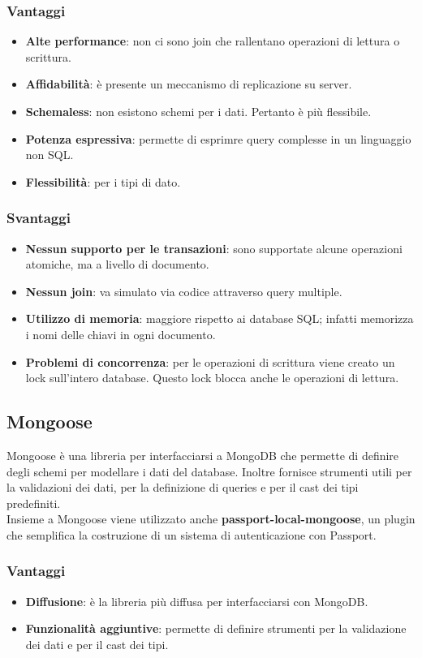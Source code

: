 \subsubsection{Vantaggi}
\begin{itemize}
\item \textbf{Alte performance}: non ci sono join che rallentano operazioni di lettura o scrittura. 
\item \textbf{Affidabilit\`a}: \`e presente un meccanismo di replicazione su server.
\item \textbf{Schemaless}: non esistono schemi per i dati. Pertanto \`e pi\`u flessibile.
\item \textbf{Potenza espressiva}: permette di esprimre query complesse in un linguaggio non SQL.
\item \textbf{Flessibilit\`a}: per i tipi di dato.
\end{itemize}
\subsubsection{Svantaggi}
\begin{itemize}
\item \textbf{Nessun supporto per le transazioni}: sono supportate alcune operazioni atomiche, ma a livello di documento.
\item \textbf{Nessun join}: va simulato via codice attraverso query multiple.
\item \textbf{Utilizzo di memoria}: maggiore rispetto ai database SQL; infatti memorizza i nomi delle chiavi in ogni documento. 
\item \textbf{Problemi di concorrenza}: per le operazioni di scrittura viene creato un lock sull'intero database. Questo lock blocca anche le operazioni di lettura.
\end{itemize}
\subsection{Mongoose}
Mongoose \`e una libreria per interfacciarsi a MongoDB che permette di definire degli schemi per modellare i dati del database. Inoltre fornisce strumenti utili per la validazioni dei dati, per la definizione di queries e per il cast dei tipi predefiniti. \\
Insieme a Mongoose viene utilizzato anche \textbf{passport-local-mongoose}, un plugin che semplifica la costruzione di un sistema di autenticazione con Passport.
\subsubsection{Vantaggi}
\begin{itemize}
\item \textbf{Diffusione}: \`e la libreria pi\`u diffusa per interfacciarsi con MongoDB.
\item \textbf{Funzionalit\`a aggiuntive}: permette di definire strumenti per la validazione dei dati e per il cast dei tipi.
\end{itemize}
